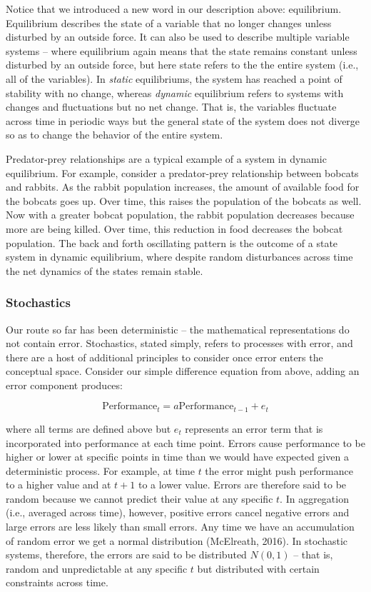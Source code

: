 \documentclass[english,,man]{apa6}
\theoremstyle{definition}
\theoremstyle{definition}
\theoremstyle{definition}
\theoremstyle{remark}
\begin{document}
Notice that we introduced a new word in our description above:
equilibrium. Equilibrium describes the state of a variable that no
longer changes unless disturbed by an outside force. It can also be used
to describe multiple variable systems -- where equilibrium again means
that the state remains constant unless disturbed by an outside force,
but here state refers to the the entire system (i.e., all of the
variables). In \emph{static} equilibriums, the system has reached a
point of stability with no change, whereas \emph{dynamic} equilibrium
refers to systems with changes and fluctuations but no net change. That
is, the variables fluctuate across time in periodic ways but the general
state of the system does not diverge so as to change the behavior of the
entire system.

Predator-prey relationships are a typical example of a system in dynamic
equilibrium. For example, consider a predator-prey relationship between
bobcats and rabbits. As the rabbit population increases, the amount of
available food for the bobcats goes up. Over time, this raises the
population of the bobcats as well. Now with a greater bobcat population,
the rabbit population decreases because more are being killed. Over
time, this reduction in food decreases the bobcat population. The back
and forth oscillating pattern is the outcome of a state system in
dynamic equilibrium, where despite random disturbances across time the
net dynamics of the states remain stable.

\hypertarget{stochastics}{%
\subsubsection{Stochastics}\label{stochastics}}

Our route so far has been deterministic -- the mathematical
representations do not contain error. Stochastics, stated simply, refers
to processes with error, and there are a host of additional principles
to consider once error enters the conceptual space. Consider our simple
difference equation from above, adding an error component produces:

\begin{equation}
\label{diffE}
\textrm{Performance}_{t} = a \textrm{Performance}_{t-1} + e_{t}
\end{equation}

\noindent where all terms are defined above but \(e_{t}\) represents an
error term that is incorporated into performance at each time point.
Errors cause performance to be higher or lower at specific points in
time than we would have expected given a deterministic process. For
example, at time \(t\) the error might push performance to a higher
value and at \(t+1\) to a lower value. Errors are therefore said to be
random because we cannot predict their value at any specific \(t\). In
aggregation (i.e., averaged across time), however, positive errors
cancel negative errors and large errors are less likely than small
errors. Any time we have an accumulation of random error we get a normal
distribution (McElreath, 2016). In stochastic systems, therefore, the
errors are said to be distributed \(N(0, 1)\) -- that is, random and
unpredictable at any specific \(t\) but distributed with certain
constraints across time.
\end{document}
